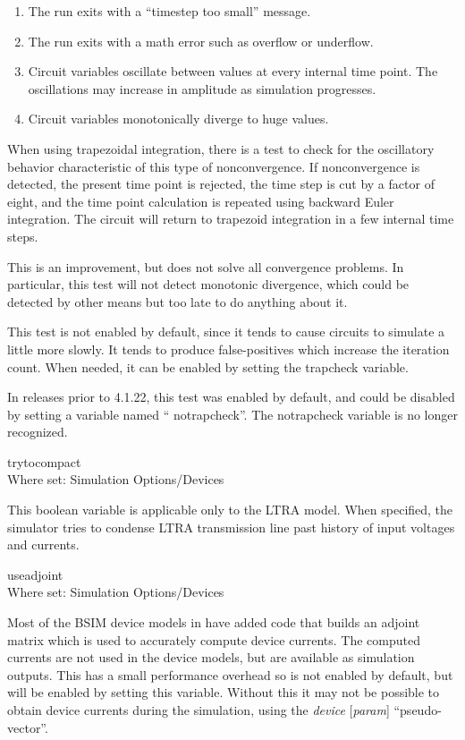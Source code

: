 \begin{description}
\begin{enumerate}
\item{The run exits with a ``timestep too small'' message.}
\item{The run exits with a math error such as overflow or underflow.}
\item{Circuit variables oscillate between values at every internal
 time point.  The oscillations may increase in amplitude as simulation
 progresses.}
\item{Circuit variables monotonically diverge to huge values.}
\end{enumerate}

When using trapezoidal integration, there is a test to check for the
oscillatory behavior characteristic of this type of nonconvergence. 
If nonconvergence is detected, the present time point is rejected, the
time step is cut by a factor of eight, and the time point calculation
is repeated using backward Euler integration.  The circuit will return
to trapezoid integration in a few internal time steps.

This is an improvement, but does not solve all convergence problems. 
In particular, this test will not detect monotonic divergence, which
could be detected by other means but too late to do anything about it.

This test is not enabled by default, since it tends to cause circuits
to simulate a little more slowly.  It tends to produce false-positives
which increase the iteration count.  When needed, it can be enabled by
setting the {\et trapcheck} variable.

In {\WRspice} releases prior to 4.1.22, this test was enabled by
default, and could be disabled by setting a variable named ``{\vt
notrapcheck}''.  The {\et notrapcheck} variable is no longer
recognized.

\item{\et trytocompact}\\
Where set: {\cb Simulation Options/Devices}

This boolean variable is applicable only to the LTRA model.  When
specified, the simulator tries to condense LTRA transmission line past
history of input voltages and currents.

\item{\et useadjoint}\\
Where set: {\cb Simulation Options/Devices}

Most of the BSIM device models in {\WRspice} have added code that
builds an adjoint matrix which is used to accurately compute device
currents.  The computed currents are not used in the device models,
but are available as simulation outputs.  This has a small performance
overhead so is not enabled by default, but will be enabled by setting
this variable.  Without this it may not be possible to obtain device
currents during the simulation, using the {\vt \@}{\it device\/}{\vt
[}{\it param\/}{\vt ]} ``pseudo-vector''.


\end{description}
